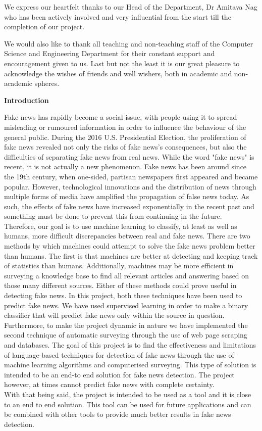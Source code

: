\documentclass[a4paper]{article}
\begin{document}
	We express our heartfelt thanks to our Head of the Department, Dr Amitava Nag who has been actively involved and very influential from the start till the completion of our project.
	
	We would also like to thank all teaching and non-teaching staff of the Computer Science and Engineering Department for their constant support and encouragement given to us. Last but not the least it is our great pleasure to acknowledge the wishes of friends and well
	wishers, both in academic and non-academic spheres.
	
	\pagebreak
	\tableofcontents
	\pagebreak
	
	\begin{center}
		\textbf{\LARGE Introduction}
	\end{center}

		\indent Fake news has rapidly become a social issue, with people using it to spread misleading or rumoured information in order to influence the behaviour of the general public. During the 2016 U.S. Presidential Election, the proliferation of fake news revealed not only the risks of fake news's consequences, but also the difficulties of separating fake news from real news. While the word "fake news" is recent, it is not actually a new phenomenon. Fake news has been around since the 19th century, when one-sided, partisan newspapers first appeared and became popular. However, technological innovations and the distribution of news through multiple forms of media have amplified the propagation of false news today. As such, the effects of fake news have increased exponentially in the recent past and something must be done to prevent this from continuing in the future.\\
		
		\indent Therefore, our goal is to use machine learning to classify, at least as well as humans, more difficult discrepancies between real and fake news. There are two methods by which machines could attempt to solve the fake news problem better than humans. The first is that machines are better at detecting and keeping track of statistics than humans. Additionally, machines may be more efficient in surveying a knowledge base to find all relevant articles and answering based on those many different sources. Either of these methods could prove useful in detecting fake news. In this project, both these techniques have been used to predict fake news. We have used supervised learning in order to make a binary classifier that will predict fake news only within the source in question. Furthermore, to make the project dynamic in nature we have implemented the second technique of automatic surveying through the use of web page scraping and databases. The goal of this project is to find the effectiveness and limitations of language-based techniques for detection of fake news through the use of machine learning algorithms and computerised surveying. This type of solution is intended to be an end-to end solution for fake news detection. The project however, at times cannot predict fake news with complete certainty. \\
		
		\indent With that being said, the project is intended to be used as a tool and it is close to an end to end solution. This tool can be used for future  applications and can be combined with other tools to provide much better results in fake news detection.
	
	
\end{document}
